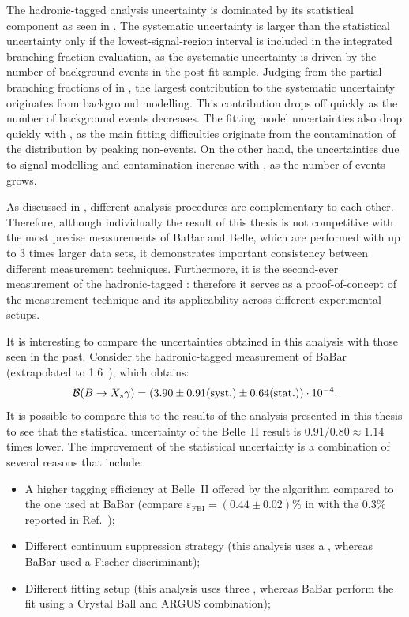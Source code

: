 The hadronic-tagged \BtoXsgamma analysis uncertainty is dominated by its statistical component as seen in .
The systematic uncertainty is larger than the statistical uncertainty only if the lowest-\EB signal-region interval is included in the integrated branching fraction evaluation, 
as the systematic uncertainty is driven by the number of background events in the post-fit sample.
Judging from the partial branching fractions of \BtoXsgamma in ,
the largest contribution to the systematic uncertainty originates from background modelling.
This contribution drops off quickly as the number of background events decreases.
The \Mbc fitting model uncertainties also drop quickly with \EB, as the main fitting difficulties originate from the contamination of the \Mbc distribution by peaking non-\BtoXsgamma events.
On the other hand, the uncertainties due to signal modelling and \BtoXdgamma contamination increase with \EB, as the number of \BtoXsdgamma events grows.

As discussed in , different analysis procedures are complementary to each other.
Therefore, although individually the result of this thesis is not competitive with the most precise measurements of BaBar and Belle, which are performed with up to 3 times larger data sets,
it demonstrates important consistency between different measurement techniques.
Furthermore, it is the second-ever measurement of the hadronic-tagged \BtoXsgamma: therefore it serves as a proof-of-concept of the measurement technique and its applicability across different experimental setups.

It is interesting to compare the uncertainties obtained in this analysis with those seen in the past.
Consider the hadronic-tagged measurement of BaBar \cite{BaBar:2007yhb} (extrapolated to 1.6~\gev), which obtains:
\begin{equation}\label{eq:babar_measurement}
    \mathcal{B}(\BtoXsgamma) = (3.90 \pm 0.91 \mathrm{(syst.)} \pm 0.64 \mathrm{(stat.)}) \cdot 10^{-4}.
\end{equation}
It is possible to compare this to the results of the analysis presented in this thesis
to see that the statistical uncertainty of the Belle~II result is $0.91/0.80\approx1.14$ times lower.
The improvement of the statistical uncertainty is a combination of several reasons that include:
\begin{itemize}
    \item A higher tagging efficiency at Belle~II offered by the \FEI algorithm compared to the one used at BaBar (compare $\varepsilon_{\mathrm{FEI}} = (0.44\pm0.02)\%$ in  with the 0.3\% reported in Ref.~\cite{BaBar:2007yhb});
    \item Different continuum suppression strategy (this analysis uses a \BDT, whereas BaBar used a Fischer discriminant);
    \item Different fitting setup (this analysis uses three , whereas BaBar perform the fit using a Crystal Ball and ARGUS \PDF combination);
\end{itemize}


